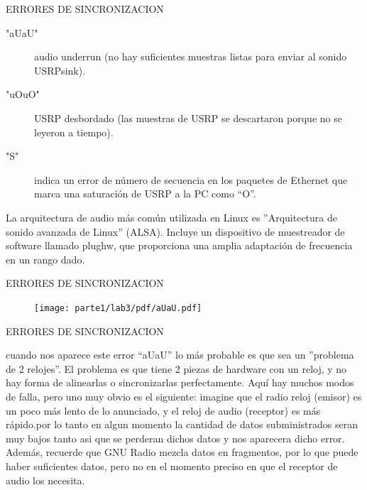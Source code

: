 \begin{frame}{ERRORES DE SINCRONIZACION}

\begin{description}


\item["aUaU"]audio underrun (no hay suficientes muestras listas para enviar al sonido USRPsink).\\ \vspace{2mm}
\item["uOuO"]USRP desbordado (las muestras de USRP se descartaron porque no se leyeron a tiempo). \\ \vspace{2mm}
\item["S"] indica un error de número de secuencia en los paquetes de Ethernet que marca una saturación de USRP a la PC como “O”.\\ \vspace{2mm}


\end{description}

La arquitectura de audio más común utilizada en Linux es ”Arquitectura de sonido avanzada de Linux” (ALSA). Incluye un dispositivo de muestreador de software llamado plughw, que proporciona una amplia adaptación de frecuencia en un rango dado.\\ \vspace{2mm}

\end{frame}
\begin{frame}{ERRORES DE SINCRONIZACION}

\begin{figure}
\begin{center}
\vspace{-8mm}
\texttt{[image: parte1/lab3/pdf/aUaU.pdf]}
\end{center}
\end{figure}
\vspace{-5mm}


\end{frame}
\begin{frame}{ERRORES DE SINCRONIZACION}

cuando nos aparece este error “aUaU” lo más probable es que sea un ”problema de 2 relojes”. El problema es que tiene 2 piezas de hardware con un reloj, y no hay forma de alinearlas o sincronizarlas perfectamente. Aquí hay muchos modos de falla, pero uno muy obvio es el siguiente: imagine que el radio reloj (emisor) es un poco más lento de lo anunciado, y el reloj de audio (receptor) es más rápido.por lo tanto en algun momento la cantidad de datos subministrados seran muy bajos tanto asi que se perderan dichos datos y nos aparecera dicho error. Además, recuerde que GNU Radio mezcla datos en fragmentos, por lo que puede haber
suficientes datos, pero no en el momento preciso en que el receptor de audio los necesita.\\ \vspace{2mm}

\end{frame}
